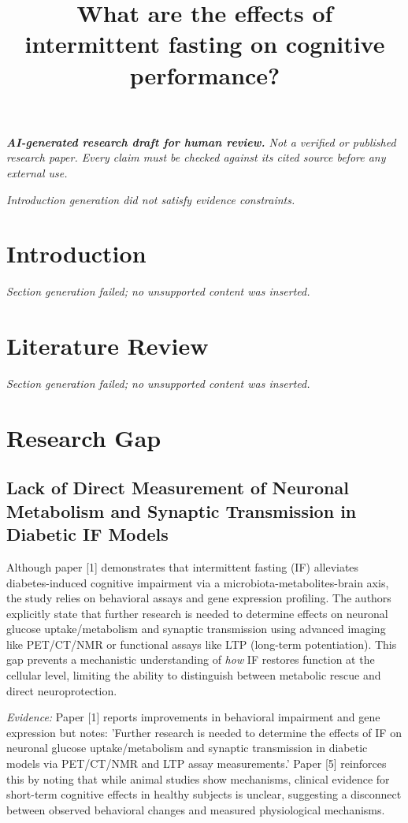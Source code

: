 \documentclass[11pt]{article}
\title{What are the effects of intermittent fasting on cognitive performance?}
\date{}
\begin{document}
\maketitle
\textit{\textbf{AI-generated research draft for human review.} Not a verified or published research paper. Every claim must be checked against its cited source before any external use.}\par

\textit{Introduction generation did not satisfy evidence constraints.}

\section{Introduction}
\textit{Section generation failed; no unsupported content was inserted.}

\section{Literature Review}
\textit{Section generation failed; no unsupported content was inserted.}

\section{Research Gap}
\subsection{Lack of Direct Measurement of Neuronal Metabolism and Synaptic Transmission in Diabetic IF Models}
Although paper [1] demonstrates that intermittent fasting (IF) alleviates diabetes-induced cognitive impairment via a microbiota-metabolites-brain axis, the study relies on behavioral assays and gene expression profiling. The authors explicitly state that further research is needed to determine effects on neuronal glucose uptake/metabolism and synaptic transmission using advanced imaging like PET/CT/NMR or functional assays like LTP (long-term potentiation). This gap prevents a mechanistic understanding of \textit{how} IF restores function at the cellular level, limiting the ability to distinguish between metabolic rescue and direct neuroprotection.

\textit{Evidence:} Paper [1] reports improvements in behavioral impairment and gene expression but notes: 'Further research is needed to determine the effects of IF on neuronal glucose uptake/metabolism and synaptic transmission in diabetic models via PET/CT/NMR and LTP assay measurements.' Paper [5] reinforces this by noting that while animal studies show mechanisms, clinical evidence for short-term cognitive effects in healthy subjects is unclear, suggesting a disconnect between observed behavioral changes and measured physiological mechanisms.
\end{document}
